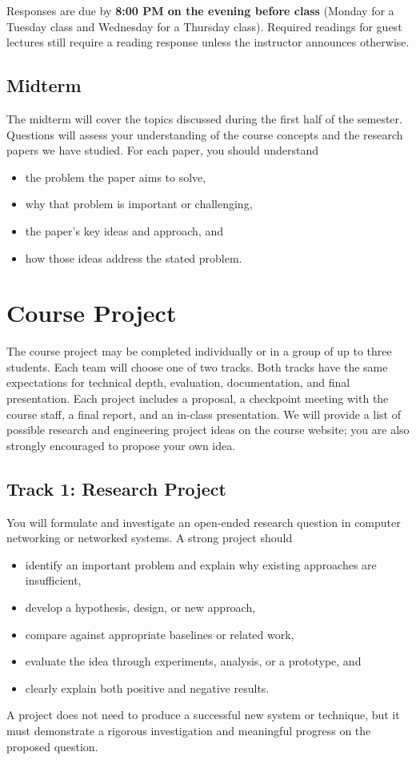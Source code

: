 \documentclass[11pt]{article}
\begin{document}
Responses are due by \textbf{8:00 PM on the evening before class} (Monday for a
Tuesday class and Wednesday for a Thursday class). Required readings for guest
lectures still require a reading response unless the instructor announces
otherwise.

\subsection{Midterm}
The midterm will cover the topics discussed during the first half of the
semester. Questions will assess your understanding of the course concepts and
the research papers we have studied. For each paper, you should understand
\begin{itemize}
  \item the problem the paper aims to solve,
  \item why that problem is important or challenging,
  \item the paper's key ideas and approach, and
  \item how those ideas address the stated problem.
\end{itemize}

\section{Course Project}

The course project may be completed individually or in a group of up to three
students. Each team will choose one of two tracks. Both tracks have the same
expectations for technical depth, evaluation, documentation, and final
presentation. Each project includes a proposal, a checkpoint meeting with the
course staff, a final report, and an in-class presentation. We will provide a
list of possible research and engineering project ideas on the course website;
you are also strongly encouraged to propose your own idea.

\subsection{Track 1: Research Project}
You will formulate and investigate an open-ended research question in computer
networking or networked systems. A strong project should
\begin{itemize}
  \item identify an important problem and explain why existing approaches are insufficient,
  \item develop a hypothesis, design, or new approach,
  \item compare against appropriate baselines or related work,
  \item evaluate the idea through experiments, analysis, or a prototype, and
  \item clearly explain both positive and negative results.
\end{itemize}
A project does not need to produce a successful new system or technique, but it
must demonstrate a rigorous investigation and meaningful progress on the
proposed question.
\end{document}
